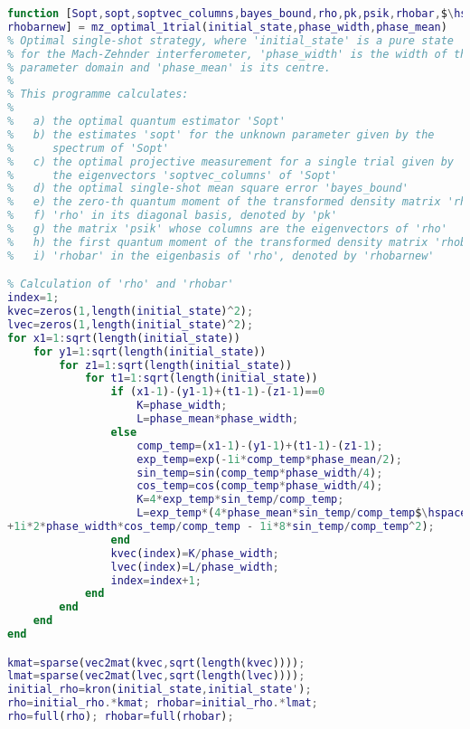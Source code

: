 \begin{lstlisting}[language=Matlab, mathescape=true]
function [Sopt,sopt,soptvec_columns,bayes_bound,rho,pk,psik,rhobar,$\hspace{0.15em}\swarrow$
rhobarnew] = mz_optimal_1trial(initial_state,phase_width,phase_mean)
% Optimal single-shot strategy, where 'initial_state' is a pure state 
% for the Mach-Zehnder interferometer, 'phase_width' is the width of the 
% parameter domain and 'phase_mean' is its centre.
%
% This programme calculates:
%
%   a) the optimal quantum estimator 'Sopt'
%   b) the estimates 'sopt' for the unknown parameter given by the
%      spectrum of 'Sopt'
%   c) the optimal projective measurement for a single trial given by
%      the eigenvectors 'soptvec_columns' of 'Sopt'
%   d) the optimal single-shot mean square error 'bayes_bound'
%   e) the zero-th quantum moment of the transformed density matrix 'rho'
%   f) 'rho' in its diagonal basis, denoted by 'pk'
%   g) the matrix 'psik' whose columns are the eigenvectors of 'rho'
%   h) the first quantum moment of the transformed density matrix 'rhobar'
%   i) 'rhobar' in the eigenbasis of 'rho', denoted by 'rhobarnew'

% Calculation of 'rho' and 'rhobar'
index=1;
kvec=zeros(1,length(initial_state)^2);
lvec=zeros(1,length(initial_state)^2);
for x1=1:sqrt(length(initial_state))
    for y1=1:sqrt(length(initial_state))
        for z1=1:sqrt(length(initial_state))
            for t1=1:sqrt(length(initial_state))
                if (x1-1)-(y1-1)+(t1-1)-(z1-1)==0
                    K=phase_width;
                    L=phase_mean*phase_width;
                else
                    comp_temp=(x1-1)-(y1-1)+(t1-1)-(z1-1);
                    exp_temp=exp(-1i*comp_temp*phase_mean/2);
                    sin_temp=sin(comp_temp*phase_width/4);
                    cos_temp=cos(comp_temp*phase_width/4);
                    K=4*exp_temp*sin_temp/comp_temp;
                    L=exp_temp*(4*phase_mean*sin_temp/comp_temp$\hspace{0.15em}\swarrow$ 
+1i*2*phase_width*cos_temp/comp_temp - 1i*8*sin_temp/comp_temp^2);
                end
                kvec(index)=K/phase_width;
                lvec(index)=L/phase_width;
                index=index+1;
            end
        end
    end
end

kmat=sparse(vec2mat(kvec,sqrt(length(kvec))));
lmat=sparse(vec2mat(lvec,sqrt(length(lvec))));
initial_rho=kron(initial_state,initial_state');
rho=initial_rho.*kmat; rhobar=initial_rho.*lmat;
rho=full(rho); rhobar=full(rhobar);


\end{lstlisting}

